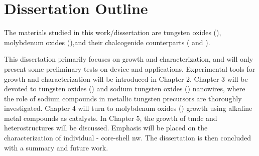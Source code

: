 \section{Dissertation Outline}

The materials studied in this work/dissertation are tungsten oxides (), molybdenum oxides (),and their chalcogenide counterparts ( and ). 

This dissertation primarily focuses on growth and characterization, and will only present some preliminary tests on device and applications. Experimental tools for growth and characterization will be introduced in Chapter 2. Chapter 3 will be devoted to tungsten oxides () and sodium tungsten oxides () nanowires, where the role of sodium compounds in metallic tungsten precursors are thoroughly investigated. Chapter 4 will turn to molybdenum oxides () growth using alkaline metal compounds as catalysts. In Chapter 5, the growth of \gls{tmdc} and heterostructures will be discussed. Emphasis will be placed on the characterization of individual - core-shell \gls{nw}. The dissertation is then concluded with a summary and future work. 

\iffalse

We have synthesized \gls{tmo} and \gls{tmdc} at nanoscale, measured their crystalline structures and optical properties and demonstrated some devices assembled using as-synthesized nanomaterials. We aim to illustrate that by nanoengineering these \gls{tmo} and \gls{tmdc}, enhanced performances over their bulk states could be expected and new properties will arise. In the remaining sections of this chapter, we will discuss some general perspectives of nanomaterials, the growth apparatus and characterization methods that apply to all experiments done in this work. Then chapter 2 will focus on growth of \ce{WO3} and its derivative. We employed thermal \gls{cvd} to synthesize \ce{WO3} \gls{nw}, and we investigated the role of impurity in tungsten metallic powders, during which we observed a new state of sodium tungsten oxides: \ce{Na5W14O44} nanowires. We also found a method to potentially obtain large yield of \ce{WO3} \gls{nw}. Chapter 3 will concentrate on \ce{MoO3}. We explored two different growth mechanism of \ce{MoO3}:\gls{vs} and \gls{vls}. We discovered that alkaline oxides can be used as catalyst to grow two distinct \ce{MoO3} morphologies: nanobelts and towers. We further demonstrated the application of as-synthesized \ce{MoO3} nanomaterials in electrochromic devices.  In chapter 4 we discuss  We synthesized  and inspected the growth of \gls{fl} \ce{WS2}. Chapter 5 will conclude with an overall summary.

\fi




